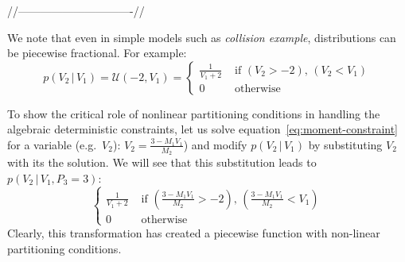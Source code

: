 \documentclass{article}
\newcommand{\case}[2]{#2 &\text{ if } #1}%
\newcommand{\otherwise}[1]{#1 &\text{ otherwise}}
\newcommand{\pr}{p}
\begin{document}
{\color{blue}
//-------------------------------//

We note that even in simple models such as \emph{collision example}, distributions can be piecewise fractional. For example:  
\[
\pr(V_2 \,|\, V_1) = \mathcal{U}(-2, V_1)
=
\begin{cases}
  \case{\scriptstyle (V_2 > -2), \, (V_2 < V_1)}{\frac{1}{V_1 + 2}}\\
 \otherwise{0}
 \end{cases}
\]

To show the critical role of nonlinear partitioning conditions in handling the algebraic deterministic constraints, 
let us solve equation~\ref{eq:moment-constraint} for a variable (e.g.\ $V_2$):
$V_2 = \frac{3 - M_1 V_1}{M_2}$) and modify $\pr(V_2 \,|\, V_1)$ by substituting $V_2$ with its the solution.
We will see that this substitution leads to $\pr(V_2 \,|\, V_1, P_3 = 3)$:
\begin{equation}
\label{e:fractional-constraint}
\begin{cases}
  \case{(\frac{3 - M_1 V_1}{M_2} > -2) , \, (\frac{3 - M_1 V_1}{M_2} < V_1)}{\frac{1}{V_1 +2}}\\
  \otherwise{0}
  \end{cases}
\end{equation}
Clearly, this transformation has created a piecewise function with non-linear partitioning conditions.

}
\end{document}
